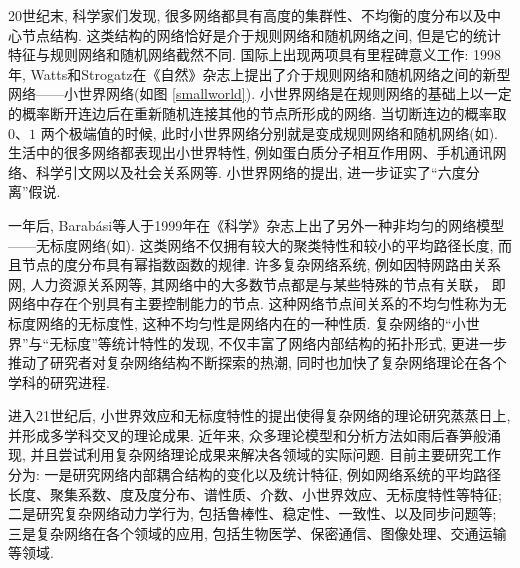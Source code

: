 20世纪末, 科学家们发现, 很多网络都具有高度的集群性、不均衡的度分布以及中心节点结构. 这类结构的网络恰好是介于规则网络和随机网络之间, 但是它的统计特征与规则网络和随机网络截然不同. 国际上出现两项具有里程碑意义工作: 1998年, Watts和Strogatz在《自然》杂志上提出了介于规则网络和随机网络之间的新型网络——小世界网络(如图 \ref{smallworld}). 小世界网络是在规则网络的基础上以一定的概率断开连边后在重新随机连接其他的节点所形成的网络. 当切断连边的概率取$0$、$1$ 两个极端值的时候, 此时小世界网络分别就是变成规则网络和随机网络(如). 生活中的很多网络都表现出小世界特性, 例如蛋白质分子相互作用网、手机通讯网络、科学引文网以及社会关系网等. 小世界网络的提出, 进一步证实了“六度分离”假说.

\begin{comment}[htb]
  \center
  \texttt{[image: introduction/smallnetwork.png]}\\
  \caption{规则网络、小世界网络、随机网络之间的关系.}\label{SWN}
\end{comment}

一年后, Barabási等人于1999年在《科学》杂志上出了另外一种非均匀的网络模型——无标度网络(如). 这类网络不仅拥有较大的聚类特性和较小的平均路径长度, 而且节点的度分布具有幂指数函数的规律. 许多复杂网络系统, 例如因特网路由关系网, 人力资源关系网等, 其网络中的大多数节点都是与某些特殊的节点有关联， 即网络中存在个别具有主要控制能力的节点. 这种网络节点间关系的不均匀性称为无标度网络的无标度性, 这种不均匀性是网络内在的一种性质.
复杂网络的“小世界”与“无标度”等统计特性的发现, 不仅丰富了网络内部结构的拓扑形式, 更进一步推动了研究者对复杂网络结构不断探索的热潮, 同时也加快了复杂网络理论在各个学科的研究进程.


进入21世纪后, 小世界效应和无标度特性的提出使得复杂网络的理论研究蒸蒸日上, 并形成多学科交叉的理论成果. 近年来, 众多理论模型和分析方法如雨后春笋般涌现, 并且尝试利用复杂网络理论成果来解决各领域的实际问题. 目前主要研究工作分为: 一是研究网络内部耦合结构的变化以及统计特征, 例如网络系统的平均路径长度、聚集系数、度及度分布、谱性质、介数、小世界效应、无标度特性等特征; 二是研究复杂网络动力学行为, 包括鲁棒性、稳定性、一致性、以及同步问题等; 三是复杂网络在各个领域的应用, 包括生物医学、保密通信、图像处理、交通运输等领域.


